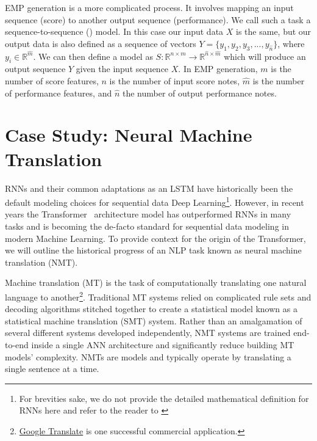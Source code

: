 EMP generation is a more complicated process. It involves mapping an input sequence (score) to another output sequence (performance). We call such a task a sequence-to-sequence (\seq{}) model. In this case our input data $X$ is the same, but our output data is also defined as a sequence of vectors $Y = \{y_1, y_2, y_3, ..., y_{\hat{n}}\}$, where $y_i \in \mathbb{R}^{\hat{m}}$. We can then define a \seq{} model as $S: \mathbb{R}^{n \times m} \rightarrow \mathbb{R}^{\hat{n} \times \hat{m}}$ which will produce an output sequence $Y$ given the input sequence $X$. In EMP generation, $m$ is the number of score features, $n$ is the number of input score notes, $\hat{m}$ is the number of performance features, and $\hat{n}$ the number of output performance notes. 

\section{Case Study: Neural Machine Translation}
RNNs and their common adaptations as an LSTM have historically been the default modeling choices for sequential data Deep Learning\footnote{For brevities sake, we do not provide the detailed mathematical definition for RNNs here and refer to the reader to \citet{goodfellow2016deep}}. However, in recent years the Transformer~\cite{vaswani2017attention} architecture model has outperformed RNNs in many tasks and is becoming the de-facto standard for sequential data modeling in modern Machine Learning. To provide context for the origin of the Transformer, we will outline the historical progress of an NLP task known as neural machine translation (NMT). 

Machine translation (MT) is the task of computationally translating one natural language to another\footnote{\href{https://translate.google.com/}{Google Translate} is one successful commercial application.}. Traditional MT systems relied on complicated rule sets and decoding algorithms stitched together to create a statistical model known as a statistical machine translation (SMT) system. Rather than an amalgamation of several different systems developed independently, NMT systems are trained end-to-end inside a single ANN architecture and significantly reduce building MT models' complexity. NMTs are \seq{} models and typically operate by translating a single sentence at a time.

